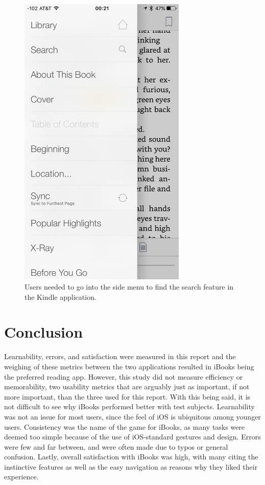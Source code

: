 \documentclass[journal, a4paper]{IEEEtran}
\begin{document}
    \begin{figure}[!hbt]
		\begin{center}
		\includegraphics[width=8cm]{kindleSearch1}
		\caption{Users needed to go into the side menu to find the search feature in the Kindle application.}
		\label{fig:kindleSearch1}
		\end{center}
	\end{figure}

\section{Conclusion}
	Learnability, errors, and satisfaction were measured in this report and the weighing of these metrics between the two applications resulted in iBooks being the preferred reading app. However, this study did not measure efficiency or memorability, two usability metrics that are arguably just as important, if not more important, than the three used for this report. With this being said, it is not difficult to see why iBooks performed better with test subjects. Learnability was not an issue for most users, since the feel of iOS is ubiquitous among younger users. Consistency was the name of the game for iBooks, as many tasks were deemed too simple because of the use of iOS-standard gestures and design. Errors were few and far between, and were often made due to typos or general confusion. Lastly, overall satisfaction with iBooks was high, with many citing the instinctive features as well as the easy navigation as reasons why they liked their experience.
\end{document}
